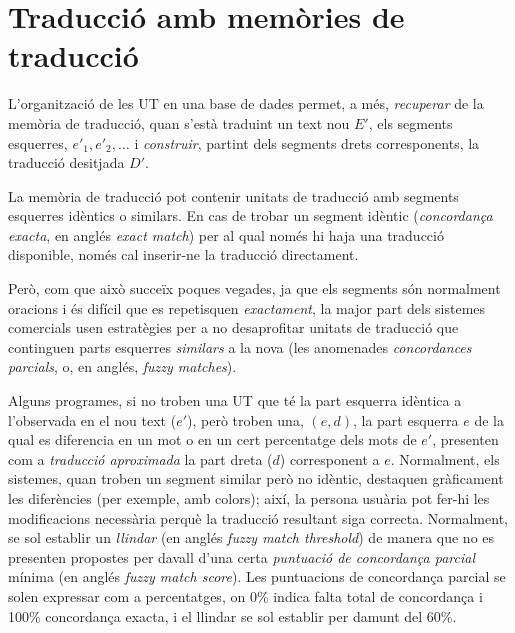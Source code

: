 \section{Traducció amb memòries de traducció}

L'organització de les UT en una base de dades permet, a més,
\emph{recuperar} de la memòria de traducció, quan s'està traduint un
text nou $E'$, els segments esquerres, $e'_1, e'_2, \ldots$ i
\emph{construir}, partint dels segments drets corresponents, la
traducció desitjada $D'$.

La memòria de traducció pot contenir unitats de traducció amb segments
esquerres idèntics o similars. En cas de trobar un segment idèntic
(\emph{concordança exacta}, en anglés \emph{exact match}) per al qual
només hi haja una traducció disponible, només cal inserir-ne la
traducció directament.


Però, com que això succeïx poques vegades, ja que els segments són
normalment oracions i és difícil que es repetisquen \emph{exactament},
la major part dels sistemes comercials usen estratègies per a no
desaprofitar unitats de traducció que continguen parts esquerres
\emph{similars} a la nova (les anomenades \emph{concordances
  parcials}, o, en anglés, \emph{fuzzy matches}).


Alguns programes, si no troben una UT que té la part esquerra idèntica
a l'observada en el nou text ($e'$), però troben una, $(e,d)$, la part
esquerra $e$ de la qual es diferencia en un mot o en un cert
percentatge dels mots de $e'$, presenten com a \emph{traducció
  aproximada} la part dreta ($d$) corresponent a $e$.  Normalment, els
sistemes, quan troben un segment similar però no idèntic, destaquen
gràficament les diferències (per exemple, amb colors); així, la
persona usuària pot fer-hi les modificacions necessària perquè la
traducció resultant siga correcta. Normalment, se sol establir un
\emph{llindar} (en anglés \emph{fuzzy match threshold}) de manera que
no es presenten propostes per davall d'una certa \emph{puntuació de
  concordança parcial} mínima (en anglés \emph{fuzzy match
  score}). Les puntuacions de concordança parcial se solen expressar
com a percentatges, on 0\% indica falta total de concordança i 100\%
concordança exacta, i el llindar se sol establir per damunt del 60\%.

